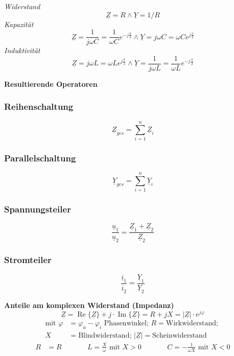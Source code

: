 \emph{Widerstand}
\[\underline{Z} = R \wedge \underline{Y} = 1/R\]
\emph{Kapazität}
\[\underline{Z} = \frac{1}{j \omega C} = \frac{1}{\omega C} e^{-j \frac{\pi}{2}} \wedge \underline{Y} = j \omega C = \omega C e^{j \frac{\pi}{2}}\]
\emph{Induktivität}
\[\underline{Z} = j \omega L = \omega L e^{j \frac{\pi}{2}} \wedge \underline{Y} = \frac{1}{j \omega L} = \frac{1}{\omega L} e^{-j \frac{\pi}{2}}\]

\newpage
\textbf{Resultierende Operatoren}

\begin{multicols}{2}{}
\subsubsection*{Reihenschaltung}
\[\underline{Z}_{ges} = \sum \limits_{i=1}^{n} \underline{Z}_i\]
\subsubsection*{Parallelschaltung}
\[\underline{Y}_{ges} = \sum \limits_{i=1}^{n} \underline{Y}_i\]
\end{multicols}

\begin{multicols}{2}{}
\subsubsection*{Spannungsteiler}
\[\frac{\underline{u}_1}{\underline{u}_2} = \frac{\underline{Z}_1 + \underline{Z}_2}{\underline{Z}_2}\]
\subsubsection*{Stromteiler}
\[\frac{\underline{i}_1}{\underline{i}_2} = \frac{\underline{Y}_1}{\underline{Y}_2}\]
\end{multicols}

\textbf{Anteile am komplexen Widerstand (Impedanz)}
\[\underline{Z} = \operatorname{Re}\{\underline{Z}\} + j \cdot \operatorname{Im}\{\underline{Z}\} = R + jX = \left|\underline{Z}\right| \cdot e^{j\varphi}\]
\begin{align*}
\text{mit }\varphi &= \varphi_u - \varphi_i \text{ Phasenwinkel; } R = \text{Wirkwiderstand; } \\ X &= \text{Blindwiderstand; } \left|\underline{Z}\right| = \text{Scheinwiderstand }
\end{align*}
\begin{alignat*}{3}
R&=R &\quad\quad& L=\frac{X}{\omega} \text{ mit } X>0 &\quad\quad& C=-\frac{1}{\omega X} \text{ mit } X<0
\end{alignat*}

